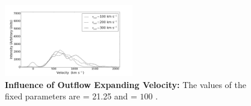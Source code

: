 \documentclass{latex/emulateapj}
\begin{document}
\begin{figure}[h!]
\begin{center}
  \includegraphics[width=0.5\textwidth]{./figures/inf_vout2_soft.png}
\end{center}
\caption{\textbf{Influence of Outflow Expanding Velocity:} The values of the fixed parameters are \lognh = 21.25 and \vgal = $100$ \kms.\\
\label{fig:influence_vout2}}
\end{figure}


%
%
%
%
\end{document}
